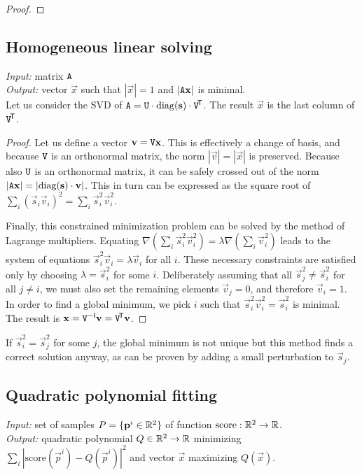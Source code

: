 \begin{proof}
\todo{\dots}
\end{proof}

\subsection{Homogeneous linear solving}
\textit{Input:} matrix $\mathtt{A}$\\
\textit{Output:} vector $\vec x$ such that $|\vec x| = 1$ and $|\mathtt{A} \mathbf{x}|$ is minimal.\\

Let us consider the SVD of $\mathtt{A} = \mathtt{U} \cdot \mathrm{diag}(\mathbf{s}) \cdot \mathtt{V}^{\!\mathsf{T}}$.
The result $\vec x$ is the last column of $\mathtt{V} ^{\!\mathsf{T}}$.

\begin{proof}
Let us define a vector $\mathbf{v} = \mathtt{V} \mathbf{x}$.
This is effectively a change of basis, and because $\mathtt{V}$ is an orthonormal matrix, the norm $|\vec v| = |\vec x|$ is preserved.
Because also $\mathtt{U}$ is an orthonormal matrix, it can be safely crossed out of the norm $|\mathtt{A} \mathbf{x}| = |\mathrm{diag}(\mathbf{s}) \cdot \mathbf{v}|$.
This in turn can be expressed as the square root of $\sum_i (\vec s_i \vec v_i)^2 = \sum_i \vec s_i^2 \vec v_i^2$.

Finally, this constrained minimization problem can be solved by the method of Lagrange multipliers.
Equating $\nabla(\sum_i \vec s_i^2 \vec v_i^2) = \lambda \nabla (\sum_i \vec v_i^2)$ leads to the system of equations $\vec s_i^2 \vec v_i = \lambda \vec v_i$ for all $i$.
These necessary constraints are satisfied only by choosing $\lambda = \vec s_i^2$ for some $i$.
Deliberately assuming that all $\vec s_j^2 \neq \vec s_i^2$ for all $j \neq i$, we must also set the remaining elements $\vec v_j = 0$, and therefore $\vec v_i = 1$.
In order to find a global minimum, we pick $i$ such that $\vec s_i^2 \vec v_i^2 = \vec s_i^2$ is minimal.
The result is $\mathbf{x} = \mathtt{V} ^{-\mathsf{I}} \mathbf{v} = \mathtt{V} ^{\!\mathsf{T}} \mathbf{v}$.
\end{proof}

If $\vec s_i^2 = \vec s_j^2$ for some $j$, the global minimum is not unique but this method finds a correct solution anyway, as can be proven by adding a small perturbation to $\vec s_j$.

\subsection{Quadratic polynomial fitting}
\textit{Input:} set of samples $P = \{\mathbf{p}^i \in \mathbb{R}^2 \}$ of function $\textrm{score}: \mathbb{R}^2 \to \mathbb{R}$.\\
\textit{Output:} quadratic polynomial $Q \in \mathbb{R}^2 \to \mathbb{R}$ minimizing $\sum_i |\textrm{score}(\vec p^i) - Q(\vec p^i)|^2$ and vector $\vec x$ maximizing $Q(\vec x)$.\\

